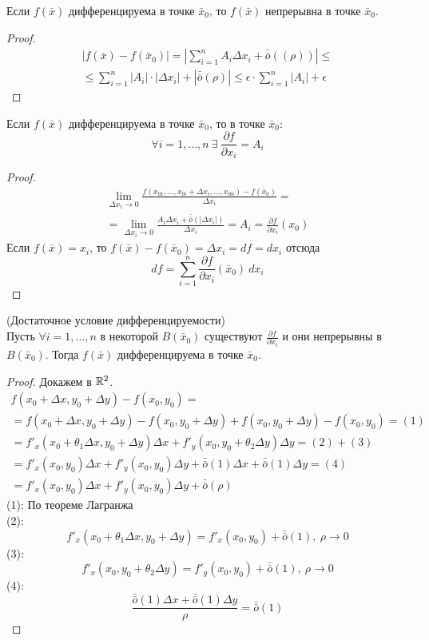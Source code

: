 \begin{theorem}
    Если $f(\bar{x})$ дифференцируема в точке $\bar{x}_0$, то $f(\bar{x})$ непрерывна в точке $\bar{x}_0$.
\end{theorem} 
\begin{proof}
    \begin{multline*}
        |f(\bar{x})-f(\bar{x}_0)|=|\sum\limits_{i=1}^{n}A_i \Delta x_i +\bar{\bar{o}}{((\rho))}|\leq\\
        \leq \sum\limits_{i=1}^{n}|A_i|\cdot|\Delta x_i|+|\bar{\bar{o}}{(\rho)}|\leq \epsilon\cdot \sum\limits_{i=1}^{n}|A_i|+\epsilon
    \end{multline*}
\end{proof} 
\begin{theorem}
    Если $f(\bar{x})$ дифференцируема в точке $\bar{x}_0$, то в точке $\bar{x}_0$:
    \[\forall i=1, \dots, n\ \exists\ \frac{\partial {f}}{\partial {x_i}}=A_i\]
\end{theorem} 
\begin{proof}
    \begin{multline*}
        \lim\limits_{\Delta x_i\to 0}\frac{f(x_{01},\dots,x_{0i}+\Delta x_i,\dots,x_{0n})-f(\bar{x}_0)}{\Delta x_i}=\\
        =\lim\limits_{\Delta x_i\to 0}\frac{A_i \Delta x_i+\bar{\bar{o}}{(|\Delta x_i|)}}{\Delta x_i}=A_i=\frac{\partial {f}}{\partial {x_i}}(x_0)
    \end{multline*}
    Если $f(\bar{x})=x_i$, то $f(\bar{x})-f(\bar{x}_0)=\Delta x_i=df=dx_i$
    отсюда
    \[df=\sum\limits_{i=1}^{n} \frac{\partial {f}}{\partial {x_i}}(\bar{x}_0)\ dx_i\]
\end{proof} 
\begin{theorem} (Достаточное условие дифференцируемости)\\
    Пусть $\forall i=1,\dots, n$ в некоторой $B(\bar{x}_0)$ существуют $\frac{\partial {f}}{\partial {x_i}}$ и они непрерывны в $B(\bar{x}_0)$. Тогда $f(\bar{x})$ дифференцируема в точке $\bar{x}_0$.
\end{theorem} 
\begin{proof}
    Докажем в $\mathbb{R}^2$.
    \begin{multline*}
        f(x_0+\Delta x, y_0+\Delta y)-f(x_0, y_0)=\\
        =f(x_0+\Delta x, y_0+\Delta y)-f(x_0, y_0+\Delta y)+f(x_0, y_0+\Delta y)-f(x_0, y_0)= (1)\\
        =f'_x(x_0+\theta_1 \Delta x, y_0+\Delta y)\Delta x+f'_y(x_0,y_0+\theta_2 \Delta y) \Delta y= (2)+(3)\\
        =f'_x(x_0,y_0)\Delta x+f'_y(x_0,y_0)\Delta y+\bar{\bar{o}}{(1)}\Delta x+\bar{\bar{o}}{(1)} \Delta y= (4)\\
        =f'_x(x_0,y_0)\Delta x+f'_y(x_0,y_0)\Delta y+\bar{\bar{o}}{(\rho)}
    \end{multline*}
    (1): По теореме Лагранжа\\
    (2):
    \[f'_x(x_0+\theta_1 \Delta x, y_0+\Delta y)=f'_x(x_0,y_0)+\bar{\bar{o}}{(1)},\ \rho \to 0\]
    (3):
    \[f'_x(x_0, y_0+\theta_2 \Delta y)=f'_y(x_0,y_0)+\bar{\bar{o}}{(1)},\ \rho \to 0\]
    (4): \[\frac{\bar{\bar{o}}{(1)}\Delta x+\bar{\bar{o}}{(1)} \Delta y}{\rho}=\bar{\bar{o}}{(1)}\]
\end{proof} 
